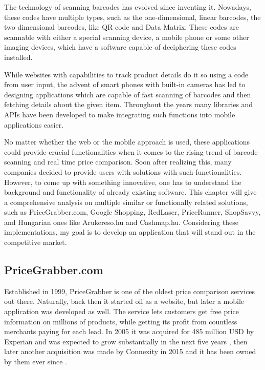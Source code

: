 The technology of scanning barcodes has evolved since inventing it. Nowadays, these codes have multiple types, such as the one-dimensional, linear barcodes, the two dimensional barcodes, like QR code and Data Matrix. These codes are scannable with either a special scanning device, a mobile phone or some other imaging devices, which have a software capable of deciphering these codes installed. \cite{barcodetypes}

While websites with capabilities to track product details do it so using a code from user input, the advent of smart phones with built-in cameras has led to designing applications which are capable of fast scanning of barcodes and then fetching details about the given item. Throughout the years many libraries and APIs have been developed to make integrating such functions into mobile applications easier. 

No matter whether the web or the mobile approach is used, these applications could provide crucial functionalities when it comes to the rising trend of barcode scanning and real time price comparison. Soon after realizing this, many companies decided to provide users with solutions with such functionalities. However, to come up with something innovative, one has to understand the background and functionality of already existing software. This chapter will give a comprehensive analysis on multiple similar or functionally related solutions, such as PriceGrabber.com, Google Shopping, RedLaser, PriceRunner, ShopSavvy, and Hungarian ones like Arukereso.hu and Cashmap.hu. Considering these implementations, my goal is to develop an application that will stand out in the competitive market.

\subsection{PriceGrabber.com}

Established in 1999, PriceGrabber is one of the oldest price comparison services out there. Naturally, back then it started off as a website, but later a mobile application was developed as well. The service lets customers get free price information on millions of products, while getting its profit from countless merchants paying for each lead. In 2005 it was acquired for 485 million USD by Experian and was expected to grow substantially in the next five years \cite{Forbes2005}, then later another acquisition was made by Connexity in 2015 and it has been owned by them ever since \cite{Connexity2015}.

